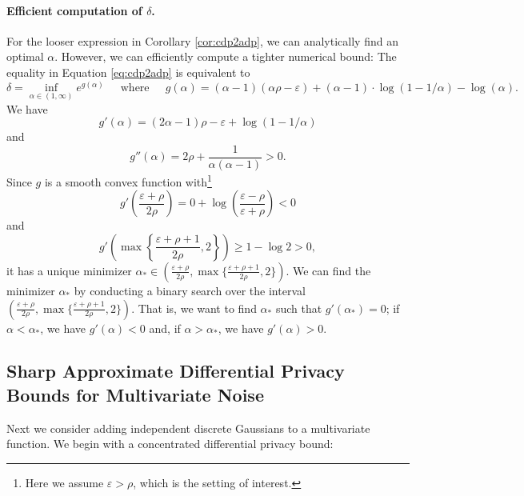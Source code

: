 \documentclass{jpc}
\newcommand{\eps}{\varepsilon}
\begin{document}
\paragraph{Efficient computation of $\delta$.} For the looser expression in Corollary \ref{cor:cdp2adp}, we can analytically find an optimal $\alpha$. However, we can efficiently compute a tighter numerical bound: The equality in Equation \ref{eq:cdp2adp} is equivalent to
\begin{equation}
    \delta = \inf_{\alpha\in(1,\infty)} e^{g(\alpha)} ~~~~~\text{ where }~~~~~ g(\alpha) = (\alpha-1)(\alpha\rho-\eps) + (\alpha-1) \cdot \log(1-1/\alpha) - \log(\alpha).
\end{equation}
We have 
\begin{equation}
    g'(\alpha)
= (2\alpha-1)\rho - \eps + \log(1-1/\alpha) 
\end{equation} and
\begin{equation}
g''(\alpha) 
= 2\rho + \frac{1}{\alpha(\alpha-1)} > 0.
\end{equation}
Since $g$ is a smooth convex function with\footnote{Here we assume $\eps>\rho$, which is the setting of interest.} \begin{equation}
    g'\left(\frac{\eps+\rho}{2\rho}\right) = 0+\log\left(\frac{\eps-\rho}{\eps+\rho}\right)<0
\end{equation}
and
\begin{equation}
    g'\left(\max\left\{\frac{\eps+\rho+1}{2\rho},2\right\}\right) \ge 1 - \log 2>0,
\end{equation} it has a unique minimizer $\alpha_* \in \left(\frac{\eps+\rho}{2\rho},\max\{\frac{\eps+\rho+1}{2\rho},2\}\right)$. We can find the minimizer $\alpha_*$ by conducting a binary search over the interval $ \left(\frac{\eps+\rho}{2\rho},\max\{\frac{\eps+\rho+1}{2\rho},2\}\right)$. That is, we want to find $\alpha_*$ such that $g'(\alpha_*)=0$; if $\alpha<\alpha_*$, we have $g'(\alpha)<0$ and, if $\alpha>\alpha_*$, we have $g'(\alpha)>0$.


\subsection{Sharp Approximate Differential Privacy Bounds for Multivariate Noise}

Next we consider adding independent discrete Gaussians to a multivariate function. We begin with a concentrated differential privacy bound:
\end{document}
